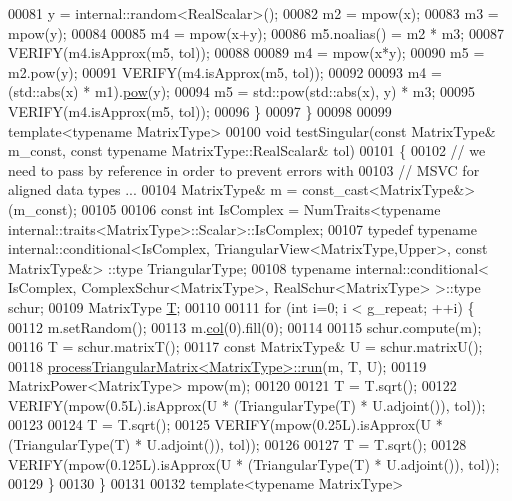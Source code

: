 \begin{DoxyCode}
00081     y = internal::random<RealScalar>();
00082     m2 = mpow(x);
00083     m3 = mpow(y);
00084 
00085     m4 = mpow(x+y);
00086     m5.noalias() = m2 * m3;
00087     VERIFY(m4.isApprox(m5, tol));
00088 
00089     m4 = mpow(x*y);
00090     m5 = m2.pow(y);
00091     VERIFY(m4.isApprox(m5, tol));
00092 
00093     m4 = (std::abs(x) * m1).\hyperlink{group___core___module_ab6dc101d82e8228a19a8840e3a29c1c9}{pow}(y);
00094     m5 = std::pow(std::abs(x), y) * m3;
00095     VERIFY(m4.isApprox(m5, tol));
00096   \}
00097 \}
00098 
00099 \textcolor{keyword}{template}<\textcolor{keyword}{typename} MatrixType>
00100 \textcolor{keywordtype}{void} testSingular(\textcolor{keyword}{const} MatrixType& m\_const, \textcolor{keyword}{const} \textcolor{keyword}{typename} MatrixType::RealScalar& tol)
00101 \{
00102   \textcolor{comment}{// we need to pass by reference in order to prevent errors with}
00103   \textcolor{comment}{// MSVC for aligned data types ...}
00104   MatrixType& m = \textcolor{keyword}{const\_cast<}MatrixType&\textcolor{keyword}{>}(m\_const);
00105 
00106   \textcolor{keyword}{const} \textcolor{keywordtype}{int} IsComplex = NumTraits<typename internal::traits<MatrixType>::Scalar>::IsComplex;
00107   \textcolor{keyword}{typedef} \textcolor{keyword}{typename} internal::conditional<IsComplex, TriangularView<MatrixType,Upper>, \textcolor{keyword}{const} MatrixType&>
      ::type TriangularType;
00108   \textcolor{keyword}{typename} internal::conditional< IsComplex, ComplexSchur<MatrixType>, RealSchur<MatrixType> >::type schur;
00109   MatrixType \hyperlink{group___sparse_core___module_class_eigen_1_1_triplet}{T};
00110 
00111   \textcolor{keywordflow}{for} (\textcolor{keywordtype}{int} i=0; i < g\_repeat; ++i) \{
00112     m.setRandom();
00113     m.\hyperlink{group___sparse_core___module_a3531e3e2098507a069a368d72d46471e}{col}(0).fill(0);
00114 
00115     schur.compute(m);
00116     T = schur.matrixT();
00117     \textcolor{keyword}{const} MatrixType& U = schur.matrixU();
00118     \hyperlink{structprocess_triangular_matrix}{processTriangularMatrix<MatrixType>::run}(m, T, U);
00119     MatrixPower<MatrixType> mpow(m);
00120 
00121     T = T.sqrt();
00122     VERIFY(mpow(0.5L).isApprox(U * (TriangularType(T) * U.adjoint()), tol));
00123 
00124     T = T.sqrt();
00125     VERIFY(mpow(0.25L).isApprox(U * (TriangularType(T) * U.adjoint()), tol));
00126 
00127     T = T.sqrt();
00128     VERIFY(mpow(0.125L).isApprox(U * (TriangularType(T) * U.adjoint()), tol));
00129   \}
00130 \}
00131 
00132 \textcolor{keyword}{template}<\textcolor{keyword}{typename} MatrixType>

\end{DoxyCode}
